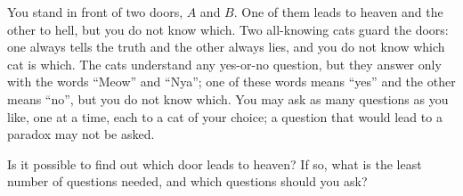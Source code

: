 You stand in front of two doors, $A$ and $B$. One of them leads to heaven and the other to hell, but you do not know which. Two all-knowing cats guard the doors: one always tells the truth and the other always lies, and you do not know which cat is which. The cats understand any yes-or-no question, but they answer only with the words ``Meow'' and ``Nya''; one of these words means ``yes'' and the other means ``no'', but you do not know which. You may ask as many questions as you like, one at a time, each to a cat of your choice; a question that would lead to a paradox may not be asked.

Is it possible to find out which door leads to heaven? If so, what is the least number of questions needed, and which questions should you ask?
